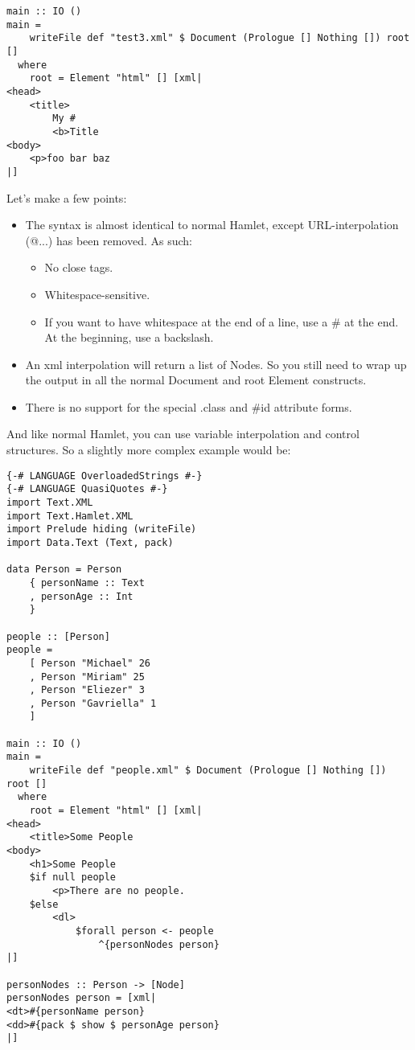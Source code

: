 \begin{itemize}
\begin{end}
\begin{lstlisting}
main :: IO ()
main =
    writeFile def "test3.xml" $ Document (Prologue [] Nothing []) root []
  where
    root = Element "html" [] [xml|
<head>
    <title>
        My #
        <b>Title
<body>
    <p>foo bar baz
|]
\end{lstlisting}%

Let's make a few points:

\begin{itemize}
\item The syntax is almost identical to normal Hamlet, except URL-interpolation (@{...}) has been removed. As such:

\begin{itemize}
\item No close tags.
\item Whitespace-sensitive.
\item If you want to have whitespace at the end of a line, use a # at the end. At the beginning, use a backslash.
\end{itemize}
  
\item An xml interpolation will return a list of Nodes. So you still need to wrap up the output in all the normal Document and root Element constructs.
\item There is no support for the special .class and #id attribute forms.
\end{itemize}

And like normal Hamlet, you can use variable interpolation and control structures. So a slightly more complex example would be:

\begin{lstlisting}
{-# LANGUAGE OverloadedStrings #-}
{-# LANGUAGE QuasiQuotes #-}
import Text.XML
import Text.Hamlet.XML
import Prelude hiding (writeFile)
import Data.Text (Text, pack)

data Person = Person
    { personName :: Text
    , personAge :: Int
    }

people :: [Person]
people =
    [ Person "Michael" 26
    , Person "Miriam" 25
    , Person "Eliezer" 3
    , Person "Gavriella" 1
    ]

main :: IO ()
main =
    writeFile def "people.xml" $ Document (Prologue [] Nothing []) root []
  where
    root = Element "html" [] [xml|
<head>
    <title>Some People
<body>
    <h1>Some People
    $if null people
        <p>There are no people.
    $else
        <dl>
            $forall person <- people
                ^{personNodes person}
|]

personNodes :: Person -> [Node]
personNodes person = [xml|
<dt>#{personName person}
<dd>#{pack $ show $ personAge person}
|]
\end{lstlisting}%


\end{end}
\end{itemize}
